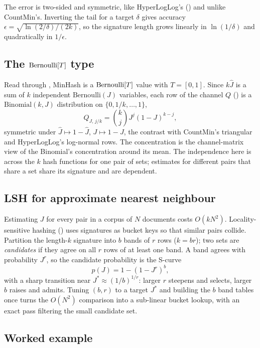 The error is two-sided and symmetric, like HyperLogLog's
() and unlike CountMin's. Inverting the tail for a
target $\delta$ gives accuracy $\epsilon = \sqrt{\ln(2/\delta)/(2k)}$, so the
signature length grows linearly in $\ln(1/\delta)$ and quadratically in
$1/\epsilon$.

\subsection*{The $\mathrm{Bernoulli}[T]$ type}

Read through , MinHash is a $\mathrm{Bernoulli}[T]$
value with $T = [0,1]$. Since $k\hat J$ is a sum of $k$ independent
$\mathrm{Bernoulli}(J)$ variables, each row of the channel $Q$
() is a $\mathrm{Binomial}(k, J)$ distribution on
$\{0, 1/k, \ldots, 1\}$,
\[
  Q_{J,\, j/k} = \binom{k}{j} J^j (1 - J)^{k-j},
\]
symmetric under $\hat J \mapsto 1 - \hat J$, $J \mapsto 1 - J$, the contrast with
CountMin's triangular and HyperLogLog's log-normal rows. The
 concentration is the channel-matrix view of the
Binomial's concentration around its mean. The independence here is across the
$k$ hash functions for one pair of sets; estimates for different pairs that
share a set share its signature and are dependent.

\subsection*{LSH for approximate nearest neighbour}

Estimating $J$ for every pair in a corpus of $N$ documents costs $O(kN^2)$.
Locality-sensitive hashing
(\textcite{indyk-motwani-1998}) uses signatures as
bucket keys so that similar pairs collide. Partition the length-$k$ signature
into $b$ bands of $r$ rows ($k = br$); two sets are \emph{candidates} if they
agree on all $r$ rows of at least one band. A band agrees with probability
$J^r$, so the candidate probability is the S-curve
\[
  p(J) = 1 - (1 - J^r)^b,
\]
with a sharp transition near $J^* \approx (1/b)^{1/r}$: larger $r$ steepens and
selects, larger $b$ raises and admits. Tuning $(b, r)$ to a target $J^*$ and
building the $b$ band tables once turns the $O(N^2)$ comparison into a
sub-linear bucket lookup, with an exact pass filtering the small candidate set.

\subsection*{Worked example}

